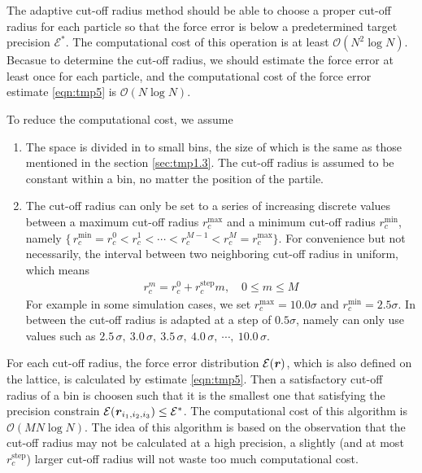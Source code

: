 \documentclass[aps,pre,preprint]{revtex4}
\renewcommand{\v}[1]{\textbf{\textit{#1}}}
\begin{document}
The adaptive cut-off radius method should be able to choose a proper
cut-off radius for each particle so that the force error is below a
predetermined target precision $\mathcal E^\ast$. The computational
cost of this operation is at least $\mathcal O(N^2\log N)$.  Becasue
to determine the cut-off radius, we should estimate the force error at
least once for each particle, and the computational cost of the force
error estimate \eqref{eqn:tmp5} is $\mathcal O(N \log N)$.

To reduce the computational cost, we assume
\begin{enumerate}
\item The space is divided in to small bins, the size of which is the
  same as those mentioned in the section \ref{sec:tmp1.3}. The cut-off
  radius is assumed to be constant within a bin, no matter the
  position of the partile.
\item The cut-off radius can only be set to a series of increasing
  discrete values between a maximum cut-off radius
  $r_c^{\textrm{max}}$ and a minimum cut-off radius
  $r_c^{\textrm{min}}$, namely $\{\,r_c^{\textrm{min}} = r_c^0 <
  r_c^1 < \cdots < r_c^{M-1} <r_c^M = r_c^{\textrm{max}}\}$. For
  convenience but not necessarily, the interval between two neighboring
  cut-off radius in uniform, which means
  \begin{align}
    r_c^m = r_c^0 + r_c^{\textrm{step}} m, \quad 0 \leq m \leq M
  \end{align}
  For example in some
  simulation cases, we set $r_c^{\textrm{max}} = 10.0\sigma$ and
  $r_c^{\textrm{min}} = 2.5\sigma$. In between the cut-off radius is
  adapted at a step of $0.5\sigma$, namely can only use values such as
  $2.5\,\sigma,\ 3.0\,\sigma,\ 3.5\,\sigma,\ 4.0\,\sigma,\ \cdots,\
  10.0\,\sigma$. 
\end{enumerate}

For each cut-off radius, the force error distribution $\mathcal E(\v
r)$, which is also defined on the lattice, is calculated by estimate
\eqref{eqn:tmp5}. Then a satisfactory cut-off radius of a bin is
choosen such that it is the smallest one that satisfying the precision
constrain $\mathcal E(\v r_{i_1,i_2,i_3}) \leq \mathcal E^\ast$. The
computational cost of this algorithm is $\mathcal O(MN\log N)$.  The
idea of this algorithm is based on the observation that the cut-off
radius may not be calculated at a high precision, a slightly (and at
most $r_c^{\textrm{step}}$) larger cut-off radius will not waste too
much computational cost.
\end{document}
